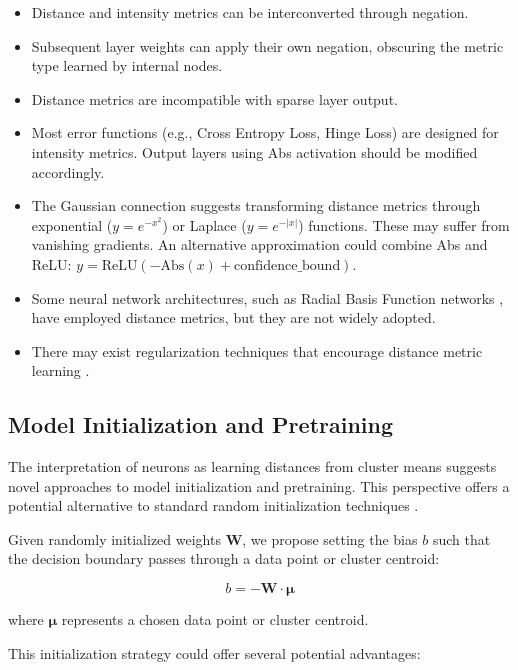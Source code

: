 \begin{itemize}
    \item Distance and intensity metrics can be interconverted through negation.
    \item Subsequent layer weights can apply their own negation, obscuring the metric type learned by internal nodes.
    \item Distance metrics are incompatible with sparse layer output.
    \item Most error functions (e.g., Cross Entropy Loss, Hinge Loss) are designed for intensity metrics. Output layers using Abs activation should be modified accordingly.
    \item The Gaussian connection suggests transforming distance metrics through exponential ($y=e^{-x^2}$) or Laplace ($y=e^{-|x|}$) functions. These may suffer from vanishing gradients. An alternative approximation could combine Abs and ReLU: $y=\text{ReLU}(-\text{Abs}(x) + \text{confidence\_bound})$.
    \item Some neural network architectures, such as Radial Basis Function networks \citep{broomhead1988radial}, have employed distance metrics, but they are not widely adopted.
    \item There may exist regularization techniques that encourage distance metric learning \citep{weinberger2009distance}.
\end{itemize}

\subsection{Model Initialization and Pretraining}

The interpretation of neurons as learning distances from cluster means suggests novel approaches to model initialization and pretraining. This perspective offers a potential alternative to standard random initialization techniques \citep{kamilov2017survey}.

Given randomly initialized weights $\mathbf{W}$, we propose setting the bias $b$ such that the decision boundary passes through a data point or cluster centroid:

\begin{equation}
    b = -\mathbf{W} \cdot \boldsymbol{\mu}
\end{equation}

where $\boldsymbol{\mu}$ represents a chosen data point or cluster centroid.

This initialization strategy could offer several potential advantages:

